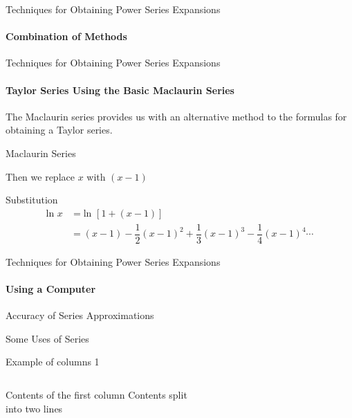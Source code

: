 \documentclass{beamer}
\begin{document}
\begin{frame}{Techniques for Obtaining Power Series Expansions}
    \framesubtitle{Combination of Methods}
\end{frame}
  
\begin{frame}{Techniques for Obtaining Power Series Expansions}
    \framesubtitle{Taylor Series Using the Basic Maclaurin Series}
    The Maclaurin series provides us with an alternative method to the formulas for obtaining a Taylor series.
   \begin{exampleblock}{Maclaurin Series}
   \end{exampleblock}
   Then we replace $x$ with $(x-1)$
   \begin{exampleblock}{Substitution}
   	\begin{align*}
   	    \mbox{ln\ } x&= \mbox{ln\ } [1+(x-1)] \\
	    &= (x-1)-\dfrac{1}{2}(x-1)^2+\dfrac{1}{3}(x-1)^3-\dfrac{1}{4}(x-1)^4\cdots
	\end{align*}
   \end{exampleblock}
\end{frame}
  
\begin{frame}{Techniques for Obtaining Power Series Expansions}
    \framesubtitle{Using a Computer}
\end{frame}
  
\begin{frame}{Accuracy of Series Approximations}
\end{frame}
  
\begin{frame}{Some Uses of Series}
\end{frame}

\begin{frame}{Example of columns 1}
    \begin{columns}[c] %
     Contents of the first column
     Contents split \\ into two lines
    \end{columns}
\end{frame}
 
\end{document}
